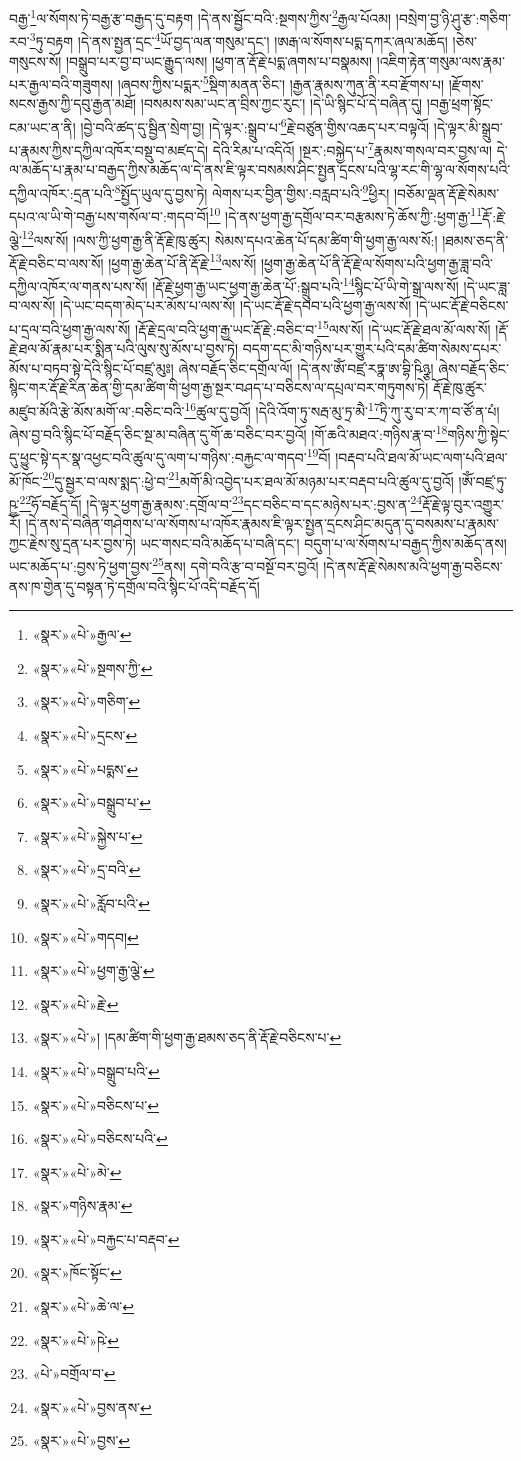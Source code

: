 བརྒྱ་\footnote{«སྣར་»«པེ་»རྒྱལ་}ལ་སོགས་ཏེ་བརྒྱ་རྩ་བརྒྱད་དུ་བརྟག །དེ་ནས་སྦྱོང་བའི་:སྔགས་ཀྱིས་\footnote{«སྣར་»«པེ་»སྔགས་ཀྱི་}རྒྱལ་པོའམ། །བསྲེག་བྱ་ཉི་ཤུ་རྩ་:གཅིག་རབ་\footnote{«སྣར་»«པེ་»གཅིག་}ཏུ་བརྟག །དེ་ནས་སྤྱན་དྲང་\footnote{«སྣར་»«པེ་»དྲངས་}ཡོ་བྱད་ལན་གསུམ་དང་། །ཨརྒ་ལ་སོགས་པདྨ་དཀར་ཞལ་མཆོད། །ཅེས་གསུངས་སོ། །བསྒྲུབ་པར་བྱ་བ་ཡང་རྒྱུད་ལས། །ཕྱག་ན་རྡོ་རྗེ་པདྨ་ཞགས་པ་བསྣམས། །འཇིག་རྟེན་གསུམ་ལས་རྣམ་པར་རྒྱལ་བའི་གཟུགས། །ཞབས་ཀྱིས་པདྨར་\footnote{«སྣར་»«པེ་»པདྨས་}སྡིག་མནན་ཅིང་། །རྒྱན་རྣམས་ཀུན་ནི་རབ་རྫོགས་པ། །རྫོགས་སངས་རྒྱས་ཀྱི་དབུ་རྒྱན་མཐོ། །བསམས་སམ་ཡང་ན་བྲིས་ཀྱང་རུང་། །དེ་ཡི་སྙིང་པོ་དེ་བཞིན་དུ། །བརྒྱ་ཕྲག་སྟོང་ངམ་ཡང་ན་ནི། །བྱེ་བའི་ཚད་དུ་སྦྱིན་སྲེག་བྱ། །དེ་ལྟར་:སྒྲུབ་པ་\footnote{«སྣར་»«པེ་»བསྒྲུབ་པ་}རྗེ་བཙུན་གྱིས་འཆད་པར་བལྟའོ། །དེ་ལྟར་མི་སྒྲུབ་པ་རྣམས་ཀྱིས་དཀྱིལ་འཁོར་བསྡུ་བ་མཛད་དེ། དེའི་རིམ་པ་འདིའོ། །སྔར་:བསྐྱེད་པ་\footnote{«སྣར་»«པེ་»སྐྱེས་པ་}རྣམས་གསལ་བར་བྱས་ལ། དེ་ལ་མཆོད་པ་རྣམ་པ་བརྒྱད་ཀྱིས་མཆོད་ལ་དེ་ནས་ཇི་ལྟར་བསམས་ཤིང་སྤྱན་དྲངས་པའི་ལྷ་རང་གི་ལྷ་ལ་སོགས་པའི་དཀྱིལ་འཁོར་:དྲན་པའི་\footnote{«སྣར་»«པེ་»དྲ་བའི་}སྤྱོད་ཡུལ་དུ་བྱས་ཏེ། ལེགས་པར་བྱིན་གྱིས་:བརླབ་པའི་\footnote{«སྣར་»«པེ་»རློབ་པའི་}ཕྱིར། །བཅོམ་ལྡན་རྡོ་རྗེ་སེམས་དཔའ་ལ་ཡི་གེ་བརྒྱ་པས་གསོལ་བ་:གདབ་བོ།\footnote{«སྣར་»«པེ་»གདབ།} །དེ་ནས་ཕྱག་རྒྱ་དགྲོལ་བར་བརྩམས་ཏེ་ཆོས་ཀྱི་:ཕྱག་རྒྱ་\footnote{«སྣར་»«པེ་»ཕྱག་རྒྱ་ལྕེ་}རྡོ་:རྗེ་ལྕེ་\footnote{«སྣར་»«པེ་»རྗེ་}ལས་སོ། །ལས་ཀྱི་ཕྱག་རྒྱ་ནི་རྡོ་རྗེ་ཁུ་ཚུར། སེམས་དཔའ་ཆེན་པོ་དམ་ཚིག་གི་ཕྱག་རྒྱ་ལས་སོ:། །ཐམས་ཅད་ནི་རྡོ་རྗེ་བཅིང་བ་ལས་སོ། །ཕྱག་རྒྱ་ཆེན་པོ་ནི་རྡོ་རྗེ་\footnote{«སྣར་»«པེ་»། །དམ་ཚིག་གི་ཕྱག་རྒྱ་ཐམས་ཅད་ནི་རྡོ་རྗེ་བཅིངས་པ་}ལས་སོ། །ཕྱག་རྒྱ་ཆེན་པོ་ནི་རྡོ་རྗེ་ལ་སོགས་པའི་ཕྱག་རྒྱ་ཟླ་བའི་དཀྱིལ་འཁོར་ལ་གནས་པས་སོ། །རྡོ་རྗེ་ཕྱག་རྒྱ་ཡང་ཕྱག་རྒྱ་ཆེན་པོ་:སྒྲུབ་པའི་\footnote{«སྣར་»«པེ་»བསྒྲུབ་པའི་}སྙིང་པོ་ཡི་གེ་སྒྲ་ལས་སོ། །དེ་ཡང་ཟླ་བ་ལས་སོ། །དེ་ཡང་བདག་མེད་པར་མོས་པ་ལས་སོ། །དེ་ཡང་རྡོ་རྗེ་དབབ་པའི་ཕྱག་རྒྱ་ལས་སོ། །དེ་ཡང་རྡོ་རྗེ་བཅིངས་པ་དྲལ་བའི་ཕྱག་རྒྱ་ལས་སོ། །རྡོ་རྗེ་དྲལ་བའི་ཕྱག་རྒྱ་ཡང་རྡོ་རྗེ་:བཅིང་བ་\footnote{«སྣར་»«པེ་»བཅིངས་པ་}ལས་སོ། །དེ་ཡང་རྡོ་རྗེ་ཐལ་མོ་ལས་སོ། །རྡོ་རྗེ་ཐལ་མོ་རྣམ་པར་སྨིན་པའི་ལུས་སུ་མོས་པ་བྱས་ཏེ། བདག་དང་མི་གཉིས་པར་གྱུར་པའི་དམ་ཚིག་སེམས་དཔར་མོས་པ་བཏབ་སྟེ་དེའི་སྙིང་པོ་བཛྲ་མུཿ། ཞེས་བརྗོད་ཅིང་དགྲོལ་ལོ། །དེ་ནས་ཨོཾ་བཛྲ་རཏྣ་ཨ་བྷི་ཥིཉྩ། ཞེས་བརྗོད་ཅིང་སྙིང་གར་རྡོ་རྗེ་རིན་ཆེན་གྱི་དམ་ཚིག་གི་ཕྱག་རྒྱ་སྔར་བཤད་པ་བཅིངས་ལ་དཔྲལ་བར་གཏུགས་ཏེ། རྡོ་རྗེ་ཁུ་ཚུར་མཛུབ་མོའི་རྩེ་མོས་མགོ་ལ་:བཅིང་བའི་\footnote{«སྣར་»«པེ་»བཅིངས་པའི་}ཚུལ་དུ་བྱའོ། །དེའི་འོག་ཏུ་སརྦ་མུ་ཏྲ་མཻ་\footnote{«སྣར་»«པེ་»མེ་}ཏྲི་ཀུ་རུ་བ་ར་ཀ་བ་ཙོ་ན་པཾ། ཞེས་བྱ་བའི་སྙིང་པོ་བརྗོད་ཅིང་སྔ་མ་བཞིན་དུ་གོ་ཆ་བཅིང་བར་བྱའོ། །གོ་ཆའི་མཐའ་:གཉིས་རྣ་བ་\footnote{«སྣར་»གཉིས་རྣམ་}གཉིས་ཀྱི་སྟེང་དུ་ཕྱུང་སྟེ་དར་སྣ་འཕྱང་བའི་ཚུལ་དུ་ལག་པ་གཉིས་:བརྐྱང་ལ་གདབ་\footnote{«སྣར་»«པེ་»བརྐྱང་པ་བརྡབ་}བོ། །བརྡབ་པའི་ཐལ་མོ་ཡང་ལག་པའི་ཐལ་མོ་ཁོང་\footnote{«སྣར་»ཁོང་སྟོང་}དུ་སྦྱར་བ་ལས་སྨད་:ཕྱེ་བ་\footnote{«སྣར་»«པེ་»ཆེ་ལ་}མགོ་མི་འབྱེད་པར་ཐལ་མོ་མཉམ་པར་བརྡབ་པའི་ཚུལ་དུ་བྱའོ། །ཨོཾ་བཛྲ་ཏུ་ཥྱ་\footnote{«སྣར་»«པེ་»ཥེ་}ཧོ་བརྗོད་དོ། །དེ་ལྟར་ཕྱག་རྒྱ་རྣམས་:དགྲོལ་བ་\footnote{«པེ་»བགྲོལ་བ་}དང་བཅིང་བ་དང་མཉེས་པར་:བྱས་ན་\footnote{«སྣར་»«པེ་»བྱས་ནས་}རྡོ་རྗེ་ལྟ་བུར་འགྱུར་རོ། །དེ་ནས་དེ་བཞིན་གཤེགས་པ་ལ་སོགས་པ་འཁོར་རྣམས་ཇི་ལྟར་སྤྱན་དྲངས་ཤིང་མདུན་དུ་བསམས་པ་རྣམས་ཀྱང་རྗེས་སུ་དྲན་པར་བྱས་ཏེ། ཡང་གསང་བའི་མཆོད་པ་བཞི་དང་། བདུག་པ་ལ་སོགས་པ་བརྒྱད་ཀྱིས་མཆོད་ནས། ཡང་མཆོད་པ་:བྱས་ཏེ་ཕྱག་བྱས་\footnote{«སྣར་»«པེ་»བྱས་}ནས། དགེ་བའི་རྩ་བ་བསྔོ་བར་བྱའོ། །དེ་ནས་རྡོ་རྗེ་སེམས་མའི་ཕྱག་རྒྱ་བཅིངས་ནས་ཁ་གྱེན་དུ་བསྟན་ཏེ་དགྲོལ་བའི་སྙིང་པོ་འདི་བརྗོད་དོ། 